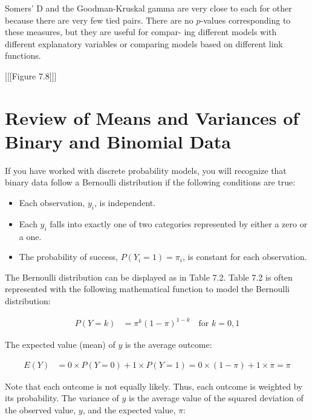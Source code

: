 \documentclass[
]{report}
\providecommand{\tightlist}{%
  \setlength{\itemsep}{0pt}\setlength{\parskip}{0pt}}
\begin{document}
Somers' D and the Goodman-Kruskal gamma are very close to each for other because there are very
few tied pairs. There are no \(p\)-values corresponding to these measures, but they are useful for compar-
ing different models with different explanatory variables or comparing models based on different link
functions.

{[}{[}{[}Figure 7.8{]}{]}{]}

\section{\texorpdfstring{\textbf{Review of Means and Variances of Binary and Binomial Data}}{Review of Means and Variances of Binary and Binomial Data}}\label{review-of-means-and-variances-of-binary-and-binomial-data}

If you have worked with discrete probability models, you will recognize that binary data follow a Bernoulli distribution if the following conditions are true:

\begin{itemize}
\tightlist
\item
  Each observation, \(y_i\), is independent.
\item
  Each \(y_i\) falls into exactly one of two categories represented by either a zero or a one.
\item
  The probability of success, \(P(Y_i = 1) = \pi_i\), is constant for each observation.
\end{itemize}

The Bernoulli distribution can be displayed as in Table 7.2.
Table 7.2 is often represented with the following mathematical function to model the Bernoulli distribution:

\begin{align}
P(Y = k) &= \pi^k (1 - \pi)^{1-k} \quad \text{for } k = 0, 1 \tag{7.17}
\end{align}

The expected value (mean) of \(y\) is the average outcome:

\begin{align}
E(Y) &= 0 \times P(Y = 0) + 1 \times P(Y = 1) = 0 \times (1 - \pi) + 1 \times \pi = \pi \tag{7.18}
\end{align}

Note that each outcome is not equally likely. Thus, each outcome is weighted by its probability. The variance of \(y\) is the average value of the squared deviation of the observed value, \(y\), and the expected value, \(\pi\):
\end{document}

